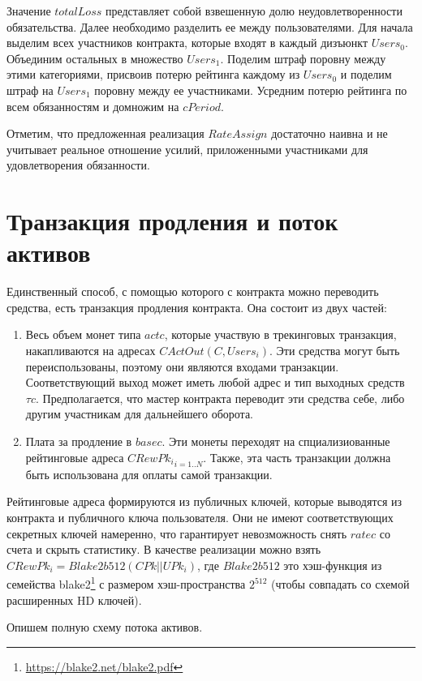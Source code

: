 \documentclass[]{itmo-student-thesis}
\begin{document}
Значение $totalLoss$ представляет собой взвешенную долю
неудовлетворенности обязательства. Далее необходимо разделить ее между
пользователями. Для начала выделим всех участников контракта, которые
входят в каждый дизъюнкт $Users_0$. Объединим остальных в множество
$Users_1$. Поделим штраф поровну между этими категориями, присвоив
потерю рейтинга каждому из $Users_0$ и поделим штраф на $Users_1$
поровну между ее участниками.  Усредним потерю рейтинга по всем
обязанностям и домножим на $cPeriod$.

Отметим, что предложенная реализация $RateAssign$ достаточно наивна и
не учитывает реальное отношение усилий, приложенными участниками для
удовлетворения обязанности.

\section{Транзакция продления и поток активов}

Единственный способ, с помощью которого с контракта можно переводить
средства, есть транзакция продления контракта. Она состоит из двух частей:

\begin{enumerate}
\item Весь объем монет типа $actc$, которые участвую в трекинговых
  транзакция, накапливаются на адресах $CActOut(C,Users_i)$. Эти
  средства могут быть переиспользованы, поэтому они являются входами
  транзакции. Соответствующий выход может иметь любой адрес и тип
  выходных средств $\tau c$. Предполагается, что мастер контракта
  переводит эти средства себе, либо другим участникам для дальнейшего
  оборота.
\item Плата за продление в $basec$. Эти монеты переходят на
  спциализиованные рейтинговые адреса ${CRewPk_i}_{i=1..N}$. Также, эта часть
  транзакции должна быть использована для оплаты самой транзакции.
\end{enumerate}

Рейтинговые адреса формируются из публичных ключей, которые выводятся
из контракта и публичного ключа пользователя. Они не имеют
соответствующих секретных ключей намеренно, что гарантирует
невозможность снять $ratec$ со счета и скрыть статистику. В качестве
реализации можно взять $CRewPk_i = Blake2b512(CPk || UPk_i)$, где
$Blake2b512$ это хэш-функция из семейства
blake2\footnote{\url{https://blake2.net/blake2.pdf}} с размером
хэш-пространства $2^{512}$ (чтобы совпадать со схемой расширенных HD
ключей).

Опишем полную схему потока активов.
\end{document}
